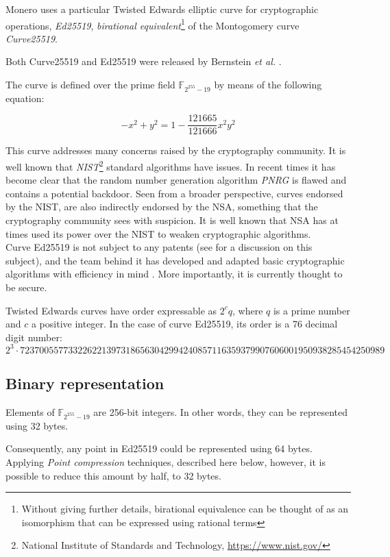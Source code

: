 Monero uses a particular Twisted Edwards elliptic curve for cryptographic operations, {\em Ed25519}, {\em birational equivalent}\footnote{Without giving further details, birational equivalence can be thought of as an isomorphism that can be expressed using rational terms} 
of the Montogomery curve {\em Curve25519}.

Both Curve25519 and Ed25519 were released by Bernstein {\em et al.} \cite{Bernstein2008, Bernstein2012, cryptoeprint:2007:286}.

The curve is defined over the prime field \(\mathbb{F}_{2^{255} - 19} \) by means of the following equation:

\[ -x^2 + y^2 = 1 - \frac{121665}{121666} x^2 y^2 \]

This curve addresses many concerns raised by the cryptography community. It is well known that {\em NIST}\footnote{National Institute of Standards and Technology, \url{https://www.nist.gov/}} 
standard algorithms have issues. In recent times it has become clear that the random number generation algorithm {\em PNRG} is flawed and contains a potential backdoor\cite{hales2014nsa}. Seen from a broader perspective, curves endorsed by the NIST, are also indirectly endorsed by the NSA, something that the cryptography community sees with suspicion. It
is well known that NSA has at times used its power over the NIST to weaken cryptographic algorithms\cite{NSA-NIST}.
\\

Curve Ed25519 is not subject to any patents (see \cite{ECC-patents} for a discussion on this subject), and the team behind it has
developed and adapted basic cryptographic algorithms with efficiency in mind \cite{cryptoeprint:2007:286}.
More importantly, it is currently thought to be secure.

Twisted Edwards curves have order expressable as \(2^c q\), where \(q\) is a prime number and \(c\) a positive integer. In the case of curve Ed25519, its order is a 76 decimal digit number:
\[2^3 \cdot 7237005577332262213973186563042994240857116359379907606001950938285454250989\]


\subsection{Binary representation}
Elements of \(\mathbb{F}_{2^{255} - 19} \) are 256-bit integers. In other words, they can be
represented using 32 bytes.

Consequently, any point in Ed25519 could be represented using 64 bytes.
Applying {\em Point compression} techniques, described here below, however, it is possible to reduce this amount by half, to 32 bytes.

